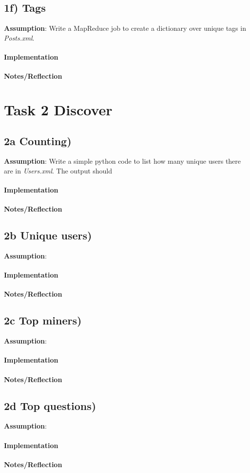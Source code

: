 \documentclass[fleqn,10pt]{wlscirep}
\begin{document}
\subsection*{1f) Tags}
\textbf{Assumption}: Write a MapReduce job to create a dictionary over unique tags in  \textit{Posts.xml}. \\ \\
\textbf{Implementation}  \\ \\
\textbf{Notes/Reflection}

\section*{Task 2 Discover}

\subsection*{2a Counting) }
\textbf{Assumption}: Write a simple python code to list how many unique users there are in \textit{Users.xml}. The output should \\ \\
\textbf{Implementation}  \\ \\
\textbf{Notes/Reflection}

\subsection*{2b Unique users) }
\textbf{Assumption}:  \\ \\
\textbf{Implementation}  \\ \\
\textbf{Notes/Reflection}

\subsection*{2c Top miners) }
\textbf{Assumption}:  \\ \\
\textbf{Implementation}  \\ \\
\textbf{Notes/Reflection}

\subsection*{2d Top questions) }
\textbf{Assumption}:  \\ \\
\textbf{Implementation}  \\ \\
\textbf{Notes/Reflection}
\end{document}
